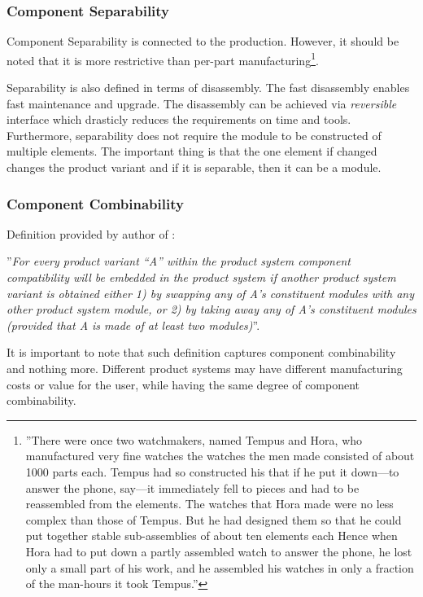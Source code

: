 \documentclass[]{scrartcl}
\begin{document}
\subsubsection{Component Separability}

Component Separability is connected to the production. However, it should be noted that it is more restrictive than per-part manufacturing\footnote{''There were once two watchmakers, named Tempus and Hora, who manufactured very fine watches the watches	the men made consisted of about 1000 parts each. Tempus had so constructed his that if he put it down—to answer the phone, say—it immediately fell to pieces and had to be reassembled from the elements. The watches that Hora made were no less complex than those of Tempus. But he had designed them so that he could put together stable sub-assemblies of about ten elements each Hence when Hora had to put down a partly assembled watch to answer the phone, he lost only a small part of his work, and he assembled his watches in only a fraction of the man-hours it took Tempus.''\cite{Salvador2007}}. 

Separability is also defined in terms of disassembly. The fast disassembly enables fast maintenance and upgrade. The disassembly can be achieved via \emph{reversible} interface which drasticly reduces the requirements on time and tools. Furthermore, separability does not require the module to be constructed of multiple elements. The important thing is that the one element if changed changes the product variant and if it is separable, then it can be a module.

\subsubsection{Component Combinability}

Definition provided by author of \cite{Salvador2007}:

''\emph{For every product variant “A” within the product system component compatibility will be embedded in the product system if another product system variant is obtained either 1) by swapping any of A’s constituent modules with any other product system module, or 2) by taking away any of A’s constituent modules (provided that A is made of at least two modules)}''.

It is important to note that such definition captures component combinability and nothing more. Different product systems may have different manufacturing costs or value for the user, while having the same degree of component combinability.
\end{document}
